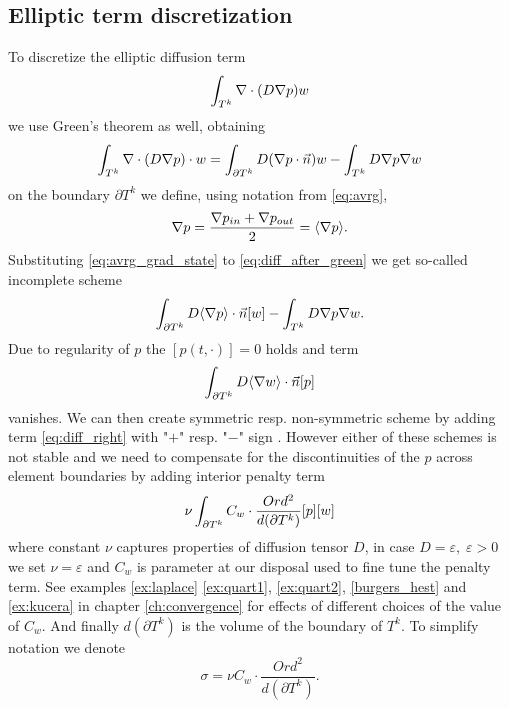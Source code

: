 \subsection{Elliptic term discretization}
\label{se:diff_term}
To discretize the elliptic diffusion term
$$
\int_{T^k}\nabla\cdot(D\nabla p) w
$$
we use Green's theorem as well, obtaining
\begin{equation}
    \label{eq:diff_after_green}
    \int_{T^k}\nabla \cdot (D \nabla p)\cdot w  = \int_{\partial T^k} D(\nabla p\cdot\vec{n}) w - \int_{T^k} D\nabla p \nabla w
\end{equation}
on the boundary $\partial T^k$ we define, using notation from \eqref{eq:avrg},
\begin{equation}
    \nabla p = \frac{\nabla p_{in} + \nabla p_{out}}{2} = \langle\nabla p\rangle.
    \label{eq:avrg_grad_state}
\end{equation}
Substituting \eqref{eq:avrg_grad_state} to \eqref{eq:diff_after_green} we get 
so-called incomplete scheme
\begin{equation}
        \int_{\partial T^k} D \langle\nabla p\rangle \cdot \vec{n} [w] - \int_{T^k} D\nabla p 
        \nabla w.
\end{equation}
Due to regularity of $p$ the $[p(t, \cdot)] = 0$ holds \cite[p. 14]{Kucera} and term
\begin{equation}\label{eq:diff_right}
    \int_{\partial T^k} D \langle\nabla w \rangle\cdot \vec{n} [p]
\end{equation}
vanishes.
We can then create symmetric resp. non-symmetric scheme by adding term 
\eqref{eq:diff_right} with "$+$" resp. "$-$" sign \cite{Kucera}. However either of these 
schemes is not stable and we need to compensate for the discontinuities of the $p$ across 
element boundaries by adding interior penalty term \cite{Kucera, 
Antonietti2013}
\begin{equation}
    \nu \int_{\partial T^k} C_w \cdot \frac{Ord^2}{d(\partial T^k)} [p][w]
\end{equation}
where constant $\nu$ captures properties of diffusion tensor $D$, in case $D = 
\varepsilon, \; \varepsilon > 0$ we set $\nu = \varepsilon$ and $C_w$ is 
parameter 
at our disposal used to fine tune the penalty term.
See examples \ref{ex:laplace} \ref{ex:quart1}, \ref{ex:quart2}, 
\ref{burgers_hest} and \ref{ex:kucera} in chapter 
\ref{ch:convergence} for effects of different choices of the value of $C_w$. 
And finally $d(\partial T^k)$ is the volume of the boundary of $T^k$. To 
simplify notation 
we denote
\begin{equation}\label{eq:diff_penalty_sigma}
\sigma = \nu C_w \cdot \frac{Ord^2}{d(\partial T^k)}.
\end{equation} 
